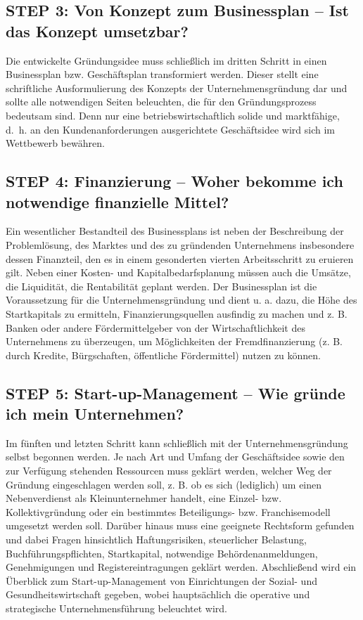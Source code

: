 \documentclass[
  letterpaper,
]{book}
\begin{document}
\subsection{STEP 3: Von Konzept zum Businessplan -- Ist das Konzept
umsetzbar?}\label{step-3-von-konzept-zum-businessplan}

Die entwickelte Gründungsidee muss schließlich im dritten Schritt in
einen Businessplan bzw. Geschäftsplan transformiert werden. Dieser
stellt eine schriftliche Ausformulierung des Konzepts der
Unternehmensgründung dar und sollte alle notwendigen Seiten beleuchten,
die für den Gründungsprozess bedeutsam sind. Denn nur eine
betriebswirtschaftlich solide und marktfähige, d.~h. an den
Kundenanforderungen ausgerichtete Geschäftsidee wird sich im Wettbewerb
bewähren.

\subsection{STEP 4: Finanzierung -- Woher bekomme ich notwendige
finanzielle Mittel?}\label{step-4-finanzierung}

Ein wesentlicher Bestandteil des Businessplans ist neben der
Beschreibung der Problemlösung, des Marktes und des zu gründenden
Unternehmens insbesondere dessen Finanzteil, den es in einem gesonderten
vierten Arbeitsschritt zu eruieren gilt. Neben einer Kosten- und
Kapitalbedarfsplanung müssen auch die Umsätze, die Liquidität, die
Rentabilität geplant werden. Der Businessplan ist die Voraussetzung für
die Unternehmensgründung und dient u. a. dazu, die Höhe des
Startkapitals zu ermitteln, Finanzierungsquellen ausfindig zu machen und
z. B. Banken oder andere Fördermittelgeber von der Wirtschaftlichkeit
des Unternehmens zu überzeugen, um Möglichkeiten der Fremdfinanzierung
(z. B. durch Kredite, Bürgschaften, öffentliche Fördermittel) nutzen zu
können.

\subsection{STEP 5: Start-up-Management -- Wie gründe ich mein
Unternehmen?}\label{step-5-start-up-management-wie-grnde-ich-mein-unternehmen}

Im fünften und letzten Schritt kann schließlich mit der
Unternehmensgründung selbst begonnen werden. Je nach Art und Umfang der
Geschäftsidee sowie den zur Verfügung stehenden Ressourcen muss geklärt
werden, welcher Weg der Gründung eingeschlagen werden soll, z. B. ob es
sich (lediglich) um einen Nebenverdienst als Kleinunternehmer handelt,
eine Einzel- bzw. Kollektivgründung oder ein bestimmtes Beteiligungs-
bzw. Franchisemodell umgesetzt werden soll. Darüber hinaus muss eine
geeignete Rechtsform gefunden und dabei Fragen hinsichtlich
Haftungsrisiken, steuerlicher Belastung, Buchführungspflichten,
Startkapital, notwendige Behördenanmeldungen, Genehmigungen und
Registereintragungen geklärt werden. Abschließend wird ein Überblick zum
Start-up-Management von Einrichtungen der Sozial- und
Gesundheitswirtschaft gegeben, wobei hauptsächlich die operative und
strategische Unternehmensführung beleuchtet wird.
\end{document}
